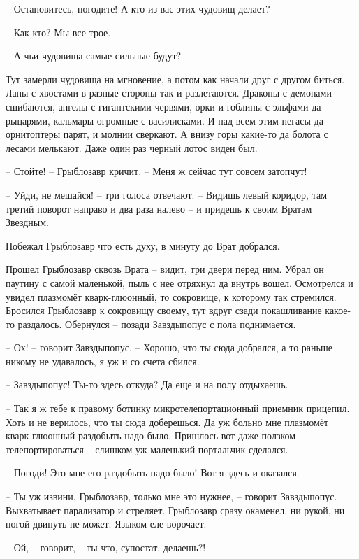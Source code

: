 \documentclass[ebook,oneside,final,openright]{memoir}
\begin{document}
– Остановитесь, погодите! А кто из вас этих чудовищ делает?\par
– Как кто? Мы все трое.\par
– А чьи чудовища самые сильные будут?\par
Тут замерли чудовища на мгновение, а потом как начали друг с другом биться. Лапы с хвостами в разные стороны так и разлетаются. Драконы с демонами сшибаются, ангелы с гигантскими червями, орки и гоблины с эльфами да рыцарями, кальмары огромные с василисками. И над всем этим пегасы да орнитоптеры парят, и молнии сверкают. А внизу горы какие-то да болота с лесами мелькают. Даже один раз черный лотос виден был. \par
– Стойте! – Грыблозавр кричит. – Меня ж сейчас тут совсем затопчут!\par
– Уйди, не мешайся! – три голоса отвечают. – Видишь левый коридор, там третий поворот направо и два раза налево – и придешь к своим Вратам Звездным.\par
\par
Побежал Грыблозавр что есть духу, в минуту до Врат добрался.\par
\par
Прошел Грыблозавр сквозь Врата – видит, три двери перед ним. Убрал он паутину с самой маленькой, пыль с нее отряхнул да внутрь вошел. Осмотрелся и увидел плазмомёт кварк-глюонный, то сокровище, к которому так стремился. Бросился Грыблозавр к сокровищу своему, тут вдруг сзади покашливание какое-то раздалось. Обернулся – позади Завздыпопус с пола поднимается.\par
– Ох! – говорит Завздыпопус. – Хорошо, что ты сюда добрался, а то раньше никому не удавалось, я уж и со счета сбился.\par
– Завздыпопус! Ты-то здесь откуда? Да еще и на полу отдыхаешь.\par
– Так я ж тебе к правому ботинку микротелепортационный приемник прицепил. Хоть и не верилось, что ты сюда доберешься. Да уж больно мне плазмомёт кварк-глюонный раздобыть надо было. Пришлось вот даже ползком телепортироваться – слишком уж маленький портальчик сделался.\par
– Погоди! Это мне его раздобыть надо было! Вот я здесь и оказался.\par
– Ты уж извини, Грыблозавр, только мне это нужнее, – говорит Завздыпопус. Выхватывает парализатор и стреляет. Грыблозавр сразу окаменел, ни рукой, ни ногой двинуть не может. Языком еле ворочает.\par
– Ой, – говорит, – ты что, супостат, делаешь?!\par
\end{document}
